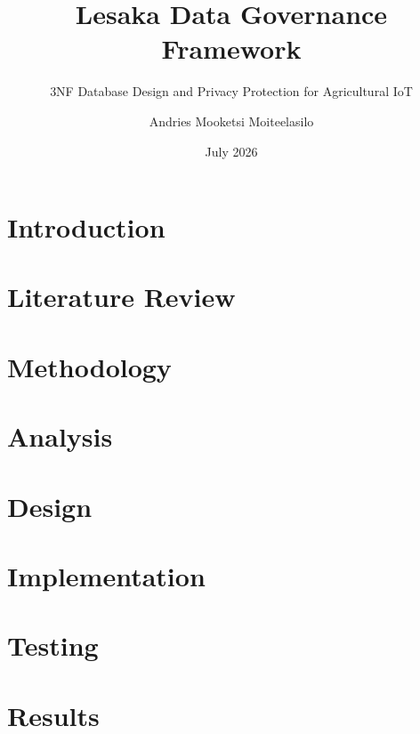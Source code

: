 \documentclass[12pt,a4paper]{report}
\title{Lesaka Data Governance Framework}
\subtitle{3NF Database Design and Privacy Protection for Agricultural IoT}
\author{Andries Mooketsi Moiteelasilo}
\date{July 2026}
\begin{document}






\tableofcontents
\listoffigures
\listoftables


\chapter{Introduction}


\chapter{Literature Review}


\chapter{Methodology}


\chapter{Analysis}


\chapter{Design}


\chapter{Implementation}


\chapter{Testing}


\chapter{Results}

\end{document}
